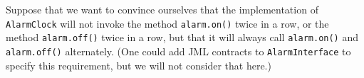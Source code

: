 \documentclass{llncs}
\begin{document}
% 
% 
% 
% 
% 

Suppose that we want to convince ourselves that the implementation of 
\texttt{AlarmClock} will not invoke the method \texttt{alarm.on()}
twice in a row, or the method \texttt{alarm.off()} twice in a row,
but that it will always call \texttt{alarm.on()} and \texttt{alarm.off()}
 alternately. 
(One could add JML contracts to \texttt{AlarmInterface} to specify this
requirement, but we will not consider that here.)
\end{document}
